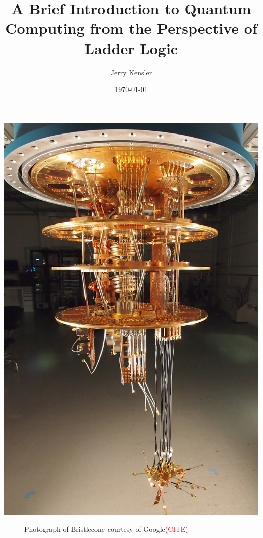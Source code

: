 \documentclass[a4paper]{article}
\title{A Brief Introduction to Quantum Computing from the Perspective of Ladder Logic\vspace{-0ex}}
\author{Jerry Kensler\vspace{-0ex}}
\date{\today\vspace{-0ex}}
\begin{document}
	
		\maketitle %
		\let\originalnewpage\newpage \let\newpage\relax \let\newpage\originalnewpage
		\begin{center}		\includegraphics[scale=0.12]{googlequantumcomputer} %
		\end{center}
	\textcolor{mygray}{
			\begin{figure}%
			\caption{Photograph of Bristlecone courtesy of Google\textcolor{red}{(CITE)}}\label{titleImage} %
			\end{figure}}
\end{document}
